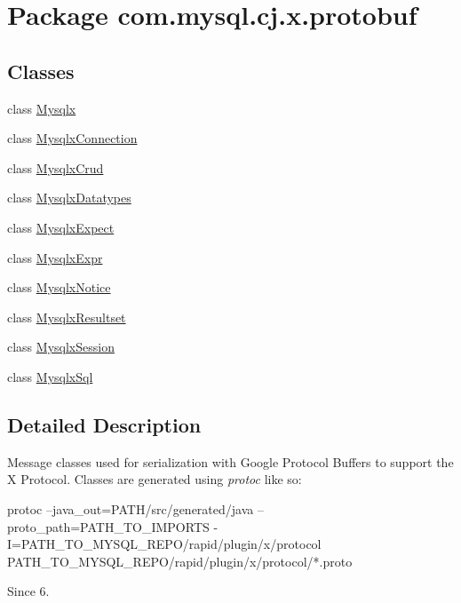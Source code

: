 \hypertarget{namespacecom_1_1mysql_1_1cj_1_1x_1_1protobuf}{}\section{Package com.\+mysql.\+cj.\+x.\+protobuf}
\label{namespacecom_1_1mysql_1_1cj_1_1x_1_1protobuf}
\subsection*{Classes}
\begin{DoxyCompactItemize}
\item 
class \mbox{\hyperlink{classcom_1_1mysql_1_1cj_1_1x_1_1protobuf_1_1_mysqlx}{Mysqlx}}
\item 
class \mbox{\hyperlink{classcom_1_1mysql_1_1cj_1_1x_1_1protobuf_1_1_mysqlx_connection}{Mysqlx\+Connection}}
\item 
class \mbox{\hyperlink{classcom_1_1mysql_1_1cj_1_1x_1_1protobuf_1_1_mysqlx_crud}{Mysqlx\+Crud}}
\item 
class \mbox{\hyperlink{classcom_1_1mysql_1_1cj_1_1x_1_1protobuf_1_1_mysqlx_datatypes}{Mysqlx\+Datatypes}}
\item 
class \mbox{\hyperlink{classcom_1_1mysql_1_1cj_1_1x_1_1protobuf_1_1_mysqlx_expect}{Mysqlx\+Expect}}
\item 
class \mbox{\hyperlink{classcom_1_1mysql_1_1cj_1_1x_1_1protobuf_1_1_mysqlx_expr}{Mysqlx\+Expr}}
\item 
class \mbox{\hyperlink{classcom_1_1mysql_1_1cj_1_1x_1_1protobuf_1_1_mysqlx_notice}{Mysqlx\+Notice}}
\item 
class \mbox{\hyperlink{classcom_1_1mysql_1_1cj_1_1x_1_1protobuf_1_1_mysqlx_resultset}{Mysqlx\+Resultset}}
\item 
class \mbox{\hyperlink{classcom_1_1mysql_1_1cj_1_1x_1_1protobuf_1_1_mysqlx_session}{Mysqlx\+Session}}
\item 
class \mbox{\hyperlink{classcom_1_1mysql_1_1cj_1_1x_1_1protobuf_1_1_mysqlx_sql}{Mysqlx\+Sql}}
\end{DoxyCompactItemize}


\subsection{Detailed Description}
Message classes used for serialization with Google Protocol Buffers to support the X Protocol. Classes are generated using {\itshape protoc} like so\+:


\begin{DoxyPre}
protoc --java\_out=PATH/src/generated/java --proto\_path=PATH\_TO\_IMPORTS -I=PATH\_TO\_MYSQL\_REPO/rapid/plugin/x/protocol PATH\_TO\_MYSQL\_REPO/rapid/plugin/x/protocol/*.proto
\end{DoxyPre}


\begin{DoxySince}{Since}
6. 
\end{DoxySince}
